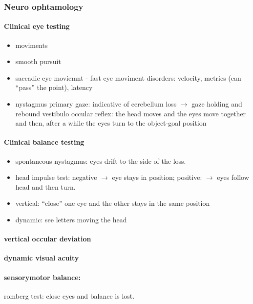 \documentclass[12pt,article,oneside,a4paper]{memoir}
\begin{document}
\subsubsection{Neuro ophtamology}
\paragraph{Clinical eye testing}  
\begin{itemize}
\item moviments
\item smooth pursuit
\item saccadic eye moviemnt - fast eye moviment
\subitem disorders: velocity, metrics (can ``pass'' the point), latency
\item nystagmus
\subitem primary gaze: indicative of cerebellum loss $\rightarrow$ gaze holding and rebound
\subitem vestibulo occular reflex: the head moves and the eyes move together and then, after a while the eyes turn to the object-goal position
\end{itemize}

\paragraph{Clinical balance testing}
\begin{itemize}
\item spontaneous nystagmus: eyes drift to the side of the loss.
\item head impulse test: negative $\rightarrow$ eye stays in position; positive: $\rightarrow$ eyes follow head and then turn.
\item vertical: ``close'' one eye and the other stays in the same position
\item dynamic: see letters moving the head
\end{itemize}

\paragraph{vertical occular deviation}
\paragraph{dynamic visual acuity}

\paragraph{sensorymotor balance:} romberg test: close eyes and balance is lost.
\end{document}
